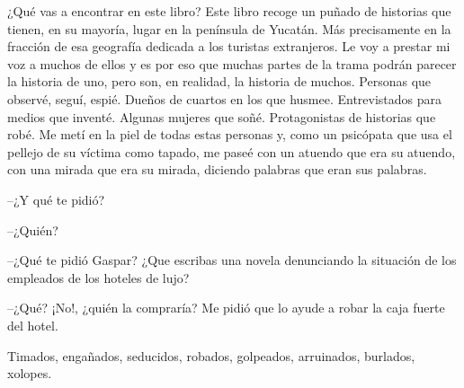 \documentclass[12pt,twoside,openright,a5paper]{book}
\begin{document}
¿Qué vas a encontrar en este libro? Este libro recoge un puñado
de historias que tienen, en su mayoría, lugar en la península de
Yucatán. Más precisamente en la fracción de esa geografía dedicada a
los turistas extranjeros. Le voy a prestar mi voz a muchos de ellos y es
por eso que muchas partes de la trama podrán parecer la historia de uno,
pero son, en realidad, la historia de muchos. Personas que observé, seguí,
espié. Dueños de cuartos en los que husmee. Entrevistados para medios
que inventé. Algunas mujeres que soñé. Protagonistas de historias que
robé. Me metí en la piel de todas estas personas y, como un psicópata
que usa el pellejo de su víctima como tapado, me paseé con un atuendo
que era su atuendo, con una mirada que era su mirada, diciendo palabras
que eran sus palabras.



\vspace{0.5cm}
\hrulefill\hspace{0.2cm} \decofourleft\decofourright \hspace{0.2cm} \hrulefill
\vspace{0.5cm}

\---¿Y qué te pidió?

\---¿Quién?

\---¿Qué te pidió Gaspar? ¿Que escribas una novela denunciando la situación de los empleados de los hoteles de lujo?

\---¿Qué? ¡No!, ¿quién la compraría? Me pidió que lo ayude a robar la caja fuerte del hotel.


\vspace{0.5cm}
\hrulefill\hspace{0.2cm} \decofourleft\decofourright \hspace{0.2cm} \hrulefill
\vspace{0.5cm}

Timados, engañados, seducidos, robados, golpeados, arruinados, burlados, xolopes.



\vspace{0.5cm}
\hrulefill\hspace{0.2cm} \decofourleft\decofourright \hspace{0.2cm} \hrulefill
\end{document}
